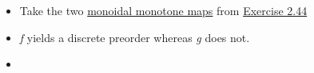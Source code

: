 \begin{itemize}
    \item Take the two \href{doc/1 math/Seven Sketches in Compositionality/Chapter 2: Resource theories/2 Symmetric monoidal preorders/5 Monoidal monotone maps/1 Monoidal monotone}{monoidal monotone maps} from \href{doc/1 math/Seven Sketches in Compositionality/Chapter 2: Resource theories/2 Symmetric monoidal preorders/5 Monoidal monotone maps/3 Exercise 2-44}{Exercise 2.44}
    \item \emph{f} yields a discrete preorder whereas \emph{g} does not.
    \item {}
  \end{itemize}
